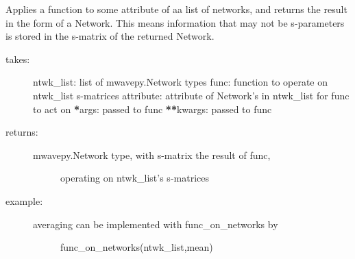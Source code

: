 \documentclass[letterpaper,10pt,english]{sphinxmanual}
\begin{document}
\begin{fulllineitems}
\label{api/mwavepy:mwavepy.network.fon}
Applies a function to some attribute of aa list of networks, and 
returns the result in the form of a Network. This means information 
that may not be s-parameters is stored in the s-matrix of the
returned Network.
\begin{description}
\item[{takes:}] \leavevmode
ntwk\_list: list of mwavepy.Network types
func: function to operate on ntwk\_list s-matrices
attribute: attribute of Network's  in ntwk\_list for func to act on
{\color{red}\bfseries{}*}args: passed to func
{\color{red}\bfseries{}**}kwargs: passed to func

\item[{returns:}] \leavevmode\begin{description}
\item[{mwavepy.Network type, with s-matrix the result of func, }] \leavevmode
operating on ntwk\_list's s-matrices

\end{description}

\item[{example:}] \leavevmode\begin{description}
\item[{averaging can be implemented with func\_on\_networks by }] \leavevmode
func\_on\_networks(ntwk\_list,mean)

\end{description}

\end{description}

\end{fulllineitems}

\end{document}
